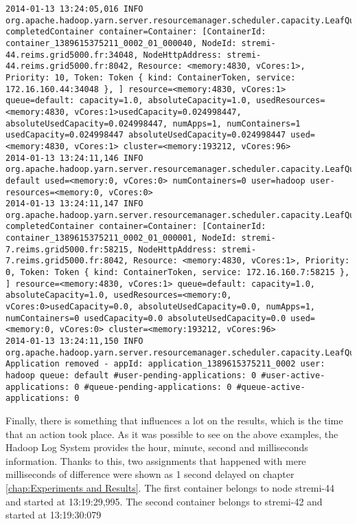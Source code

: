 \begin{lstlisting}
2014-01-13 13:24:05,016 INFO org.apache.hadoop.yarn.server.resourcemanager.scheduler.capacity.LeafQueue: completedContainer container=Container: [ContainerId: container_1389615375211_0002_01_000040, NodeId: stremi-44.reims.grid5000.fr:34048, NodeHttpAddress: stremi-44.reims.grid5000.fr:8042, Resource: <memory:4830, vCores:1>, Priority: 10, Token: Token { kind: ContainerToken, service: 172.16.160.44:34048 }, ] resource=<memory:4830, vCores:1> queue=default: capacity=1.0, absoluteCapacity=1.0, usedResources=<memory:4830, vCores:1>usedCapacity=0.024998447, absoluteUsedCapacity=0.024998447, numApps=1, numContainers=1 usedCapacity=0.024998447 absoluteUsedCapacity=0.024998447 used=<memory:4830, vCores:1> cluster=<memory:193212, vCores:96>
2014-01-13 13:24:11,146 INFO org.apache.hadoop.yarn.server.resourcemanager.scheduler.capacity.LeafQueue: default used=<memory:0, vCores:0> numContainers=0 user=hadoop user-resources=<memory:0, vCores:0>
2014-01-13 13:24:11,147 INFO org.apache.hadoop.yarn.server.resourcemanager.scheduler.capacity.LeafQueue: completedContainer container=Container: [ContainerId: container_1389615375211_0002_01_000001, NodeId: stremi-7.reims.grid5000.fr:58215, NodeHttpAddress: stremi-7.reims.grid5000.fr:8042, Resource: <memory:4830, vCores:1>, Priority: 0, Token: Token { kind: ContainerToken, service: 172.16.160.7:58215 }, ] resource=<memory:4830, vCores:1> queue=default: capacity=1.0, absoluteCapacity=1.0, usedResources=<memory:0, vCores:0>usedCapacity=0.0, absoluteUsedCapacity=0.0, numApps=1, numContainers=0 usedCapacity=0.0 absoluteUsedCapacity=0.0 used=<memory:0, vCores:0> cluster=<memory:193212, vCores:96>
2014-01-13 13:24:11,150 INFO org.apache.hadoop.yarn.server.resourcemanager.scheduler.capacity.LeafQueue: Application removed - appId: application_1389615375211_0002 user: hadoop queue: default #user-pending-applications: 0 #user-active-applications: 0 #queue-pending-applications: 0 #queue-active-applications: 0
\end{lstlisting}

Finally, there is something that influences a lot on the results, which is the time that an action took place. As it was possible to see on the above examples, the Hadoop Log System provides the hour, minute, second and milliseconds information. Thanks to this, two assignments that happened with mere milliseconds of difference were shown as 1 second delayed on chapter \ref{chap:Experiments and Results}. The first container belongs to node stremi-44 and started at 13:19:29,995. The second container belongs to stremi-42 and started at 13:19:30:079

